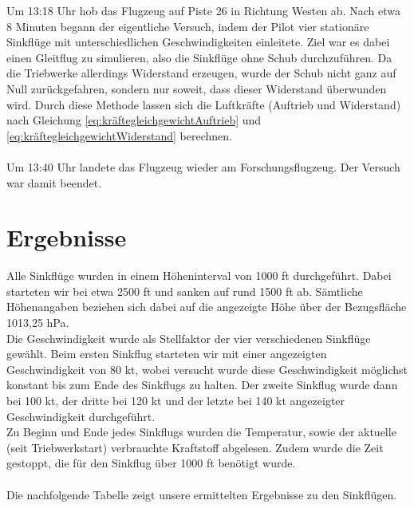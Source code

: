\vspace{-0.3cm}
\begin{center}
\end{center}
\vspace{0.8cm}

\noindent Um 13:18 Uhr hob das Flugzeug auf Piste 26 in Richtung Westen ab. Nach etwa 8 Minuten begann der eigentliche Versuch, indem der Pilot vier stationäre Sinkflüge mit unterschiedlichen Geschwindigkeiten einleitete. Ziel war es dabei einen Gleitflug zu simulieren, also die Sinkflüge ohne Schub durchzuführen. Da die Triebwerke allerdings Widerstand erzeugen, wurde der Schub nicht ganz auf Null zurückgefahren, sondern nur soweit, dass dieser Widerstand überwunden wird. Durch diese Methode lassen sich die Luftkräfte (Auftrieb und Widerstand) nach Gleichung \ref{eq:kräftegleichgewichtAuftrieb} und \ref{eq:kräftegleichgewichtWiderstand} berechnen.\\\\  
Um 13:40 Uhr landete das Flugzeug wieder am Forschungsflugzeug. Der Versuch war damit beendet.

\section{Ergebnisse}
Alle Sinkflüge wurden in einem Höheninterval von 1000 ft durchgeführt. Dabei starteten wir bei etwa 2500 ft und sanken auf rund 1500 ft ab. Sämtliche Höhenangaben beziehen sich dabei auf die angezeigte Höhe über der Bezugsfläche 1013,25 hPa.\\
Die Geschwindigkeit wurde als Stellfaktor der vier verschiedenen Sinkflüge gewählt. Beim ersten Sinkflug starteten wir mit einer angezeigten Geschwindigkeit von 80 kt, wobei versucht wurde diese Geschwindigkeit möglichst konstant bis zum Ende des Sinkflugs zu halten. Der zweite Sinkflug wurde dann bei 100 kt, der dritte bei 120 kt und der letzte bei 140 kt angezeigter Geschwindigkeit durchgeführt.\\
Zu Beginn und Ende jedes Sinkflugs wurden die Temperatur, sowie der aktuelle (seit Triebwerkstart) verbrauchte Kraftstoff abgelesen. Zudem wurde die Zeit gestoppt, die für den Sinkflug über 1000 ft benötigt wurde.\\\\
Die nachfolgende Tabelle zeigt unsere ermittelten Ergebnisse zu den Sinkflügen.


